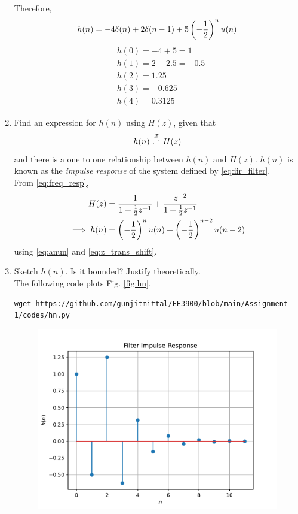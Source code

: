 \documentclass[journal,12pt,twocolumn]{IEEEtran}
\renewcommand\thesection{\arabic{section}}
\begin{document}
\begin{enumerate}[label=\thesection.\arabic*]
	Therefore,
	\begin{equation}
		h(n) = -4\delta(n) + 2\delta(n - 1) + 5\left(-\frac12\right)^n u(n)
	\end{equation}
  \begin{align}
    &h(0) = -4 + 5 = 1\\
    &h(1) = 2 - 2.5 = -0.5\\
    &h(2) = 1.25\\
    &h(3) = -0.625\\
    &h(4) = 0.3125
  \end{align}
\item \label{prob:impulse_resp}
Find an expression for $h(n)$ using $H(z)$, given that 
\begin{equation}
\label{eq:impulse_resp}
h(n) \overset{\mathcal{Z}}{ \rightleftharpoons} H(z)
\end{equation}
and there is a one to one relationship between $h(n)$ and $H(z)$. $h(n)$ is known as the {\em impulse response} of the
system defined by \eqref{eq:iir_filter}.
\\
\solution From \eqref{eq:freq_resp},
\begin{align}
H(z) &= \frac{1}{1 + \frac{1}{2}z^{-1}} + \frac{ z^{-2}}{1 + \frac{1}{2}z^{-1}}
\\
\implies h(n) &= \left(-\frac{1}{2}\right)^{n}u(n) + \left(-\frac{1}{2}\right)^{n-2}u(n-2)
\end{align}
using \eqref{eq:anun} and \eqref{eq:z_trans_shift}.
\item Sketch $h(n)$. Is it bounded? Justify theoretically.
\\
\solution The following code plots Fig. \ref{fig:hn}.
\begin{lstlisting}
wget https://github.com/gunjitmittal/EE3900/blob/main/Assignment-1/codes/hn.py
\end{lstlisting}
\begin{figure}[!ht]
\centering
\includegraphics[width=\columnwidth]{./figs/hn}

\end{figure}
\end{enumerate}
\end{document}
